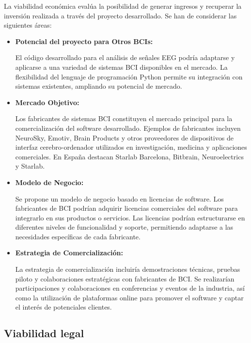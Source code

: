 La viabilidad económica evalúa la posibilidad de generar ingresos y recuperar la inversión realizada a través del proyecto desarrollado. Se han de considerar las siguientes áreas:
  \begin{itemize}
   \tightlist
   \item
    \textbf{Potencial del proyecto para Otros BCIs:} 
    
    El código desarrollado para el análisis de señales EEG podría adaptarse y aplicarse a una variedad de sistemas BCI disponibles en el mercado. La flexibilidad del lenguaje de programación Python permite su integración con sistemas existentes, ampliando su potencial de mercado.
    
   \item
    \textbf{Mercado Objetivo:} 
    
    Los fabricantes de sistemas BCI constituyen el mercado principal para la comercialización del software desarrollado. Ejemplos de fabricantes incluyen NeuroSky, Emotiv, Brain Products y otros proveedores de dispositivos de interfaz cerebro-ordenador utilizados en investigación, medicina y aplicaciones comerciales. En España destacan Starlab Barcelona, Bitbrain, Neuroelectrics y Starlab.
    
   \item
    \textbf{Modelo de Negocio:} 
    
    Se propone un modelo de negocio basado en licencias de software. Los fabricantes de BCI podrían adquirir licencias comerciales del software para integrarlo en sus productos o servicios. Las licencias podrían estructurarse en diferentes niveles de funcionalidad y soporte, permitiendo adaptarse a las necesidades específicas de cada fabricante.
    
   \item
    \textbf{Estrategia de Comercialización:}
    
    La estrategia de comercialización incluiría demostraciones técnicas, pruebas piloto y colaboraciones estratégicas con fabricantes de BCI. Se realizarían  participaciones y colaboraciones en conferencias y eventos de la industria, así como la utilización de plataformas online para promover el software y captar el interés de potenciales clientes.

\end{itemize}



\subsection{Viabilidad legal}


